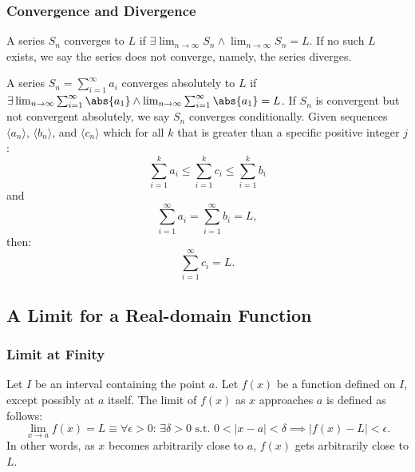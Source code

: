\documentclass[a4paper,12pt]{report}
\begin{document}
\subsubsection{Convergence and Divergence}
A series \(S_n\) converges to \(L\) if \(\exists \lim_{n \to \infty} S_n \land \lim_{n \to \infty} S_n = L\). If no such \(L\) exists, we say the series does not converge, namely, the series diverges.

A series $S_n=\sum_{i=1}^{\infty}a_i$ converges absolutely to $L$ if $\exists\lim_{n\to\infty}\sum_{i=1}^{\infty}\abs{a_1}\land\lim_{n\to\infty}\sum_{i=1}^{\infty}\abs{a_1}=L$. If $S_n$ is convergent but not convergent absolutely, we say $S_n$ converges conditionally.
Given sequences $\langle a_n\rangle$, $\langle b_n\rangle$, and $\langle c_n\rangle$ which for all $k$ that is greater than a specific positive integer $j$:
\[\sum_{i=1}^ka_i\leq\sum_{i=1}^kc_i\leq\sum_{i=1}^kb_i\]
and
\[\sum_{i=1}^{\infty}a_i=\sum_{i=1}^{\infty}b_i=L,\]
then: 
\[\sum_{i=1}^{\infty}c_i=L.\]
\subsection{A Limit for a Real-domain Function}
\subsubsection{Limit at Finity}
Let \(I\) be an interval containing the point \(a\). Let \( f(x) \) be a function defined on \(I\), except possibly at \(a\) itself. The limit of \( f(x) \) as \( x \) approaches \( a \) is defined as follows:
\[\lim_{x \to a} f(x) = L \equiv \forall \epsilon > 0:\, \exists \delta > 0 \text{\ s.t.\ } 0 < |x - a| < \delta \implies |f(x) - L| < \epsilon.\]
In other words, as \(x\) becomes arbitrarily close to \(a\), \(f(x)\) gets arbitrarily close to \(L\).
\end{document}

